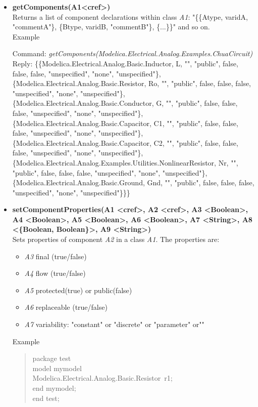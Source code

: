 \documentclass[11pt,a4paper,oneside,english]{book}
\newenvironment{modelicaExamples}{\begin{itemize}}{\end{itemize}}
\newcommand{\api}[2]{\item \textbf{#1} \\ #2}
\newcommand{\tab}{\hspace{2em}}
\newcommand{\command}[1]{Command: \textit{#1}\\}
\newcommand{\reply}[1]{Reply: #1}
\newcommand{\functionex}[2]{\begin{singlespace} \command{#1} \reply{#2} \end{singlespace}}
\newcommand{\examples}{Example}
\newenvironment{mocode}{\begin{verse}\begin{singlespace}\begin{scriptsize}\ttfamily}{\end{scriptsize}\end{singlespace}\end{verse}}
\begin{document}
\begin{modelicaExamples}
		\api{getComponents(A1<cref>)}{Returns a list of component declarations within class \textit{A1}:  "\{\{Atype, varidA, "commentA"\}, \{Btype, varidB, "commentB"\},  \{...\}\}" and so on.\\
		\examples
		\functionex{getComponents(Modelica.Electrical.Analog.Examples.Chua\-Cir\-cuit)}
		{\{\{Modelica.Electrical.Analog.Basic.Inductor, L, "", "pu\-blic", fal\-se, fal\-se, fal\-se, "un\-spe\-ci\-fi\-ed", "none", "unspecified"\},\\
\tab \{Modelica.Electrical.Analog.Basic.Resistor, Ro, "", "public", fal\-se, fal\-se, fal\-se, "unspecified", "none", "unspecified"\},\\
\tab \{Modelica.Electrical.Analog.Basic.Conductor, G, "", "public", fal\-se, fal\-se, fal\-se, "unspecified", "none", "unspecified"\},\\
\tab \{Modelica.Electrical.Analog.Basic.Capacitor, C1, "", "public", fal\-se, fal\-se, fal\-se, "unspecified", "none", "unspecified"\},\\
\tab \{Modelica.Electrical.Analog.Basic.Capacitor, C2, "", "public", fal\-se, fal\-se, fal\-se, "unspecified", "none", "unspecified"\},\\
\tab \{Modelica.Electrical.Analog.Examples.Utilities.Non\-li\-ne\-ar\-Re\-si\-stor, Nr, "", \\"pu\-blic", fal\-se, fal\-se, fal\-se, "unspecified", "none", "unspecified"\},\\
\tab \{Modelica.Electrical.Analog.Basic.Ground, Gnd, "", "public", fal\-se, fal\-se, fal\-se, "unspecified", "none", "unspecified"\}\}\}
		}
		}


		\api{setComponentProperties(A1 <cref>, A2 <cref>, A3 <Bo\-o\-le\-an>, A4 <Bo\-o\-le\-an>, A5 <Bo\-o\-le\-an>, A6 <Bo\-o\-le\-an>, A7 <String>, A8 <\{Bo\-o\-le\-an, Bo\-o\-le\-an\}>, A9 <String>)}{Sets properties of component \textit{A2} in a class \textit{A1}. The properties are:
\begin{itemize}
	\item\textit{A3} final (true/false)
		\item\textit{A4} flow (true/false)
	        \item\textit{A5} protected(true) or public(false)
		\item\textit{A6} replaceable (true/false)
		\item\textit{A7} variability: "constant" or "discrete" or "parameter" or""
\end{itemize}
\examples
\begin{mocode}
		package test\\
		\tab model mymodel\\
		\tab\tab Modelica.Electrical.Analog.Basic.Re\-si\-stor~r1;\\
		\tab end mymodel;\\
		end test;\\
		\end{mocode}

}
\end{modelicaExamples}
\end{document}
